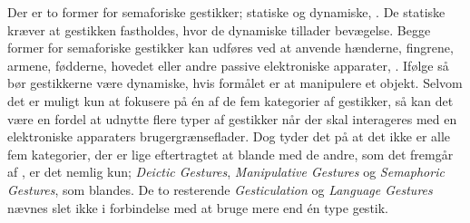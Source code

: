 Der er to former for semaforiske gestikker; statiske og dynamiske, \parencite[s. 7]{PDF:ATaxonomyOfGestures}. De statiske kræver at gestikken fastholdes, hvor de dynamiske tillader bevægelse. Begge former for semaforiske gestikker kan udføres ved at anvende hænderne, fingrene, armene, fødderne, hovedet eller andre passive elektroniske apparater, \parencite[s. 7]{PDF:ATaxonomyOfGestures}. Ifølge \textcite[s. 823]{PDF:UnderstandingNaturalness} så bør gestikkerne være dynamiske, hvis formålet er at manipulere et objekt. \blankline
%
Selvom det er muligt kun at fokusere på én af de fem kategorier af gestikker, så kan det være en fordel at udnytte flere typer af gestikker når der skal interageres med en elektroniske apparaters brugergrænseflader. Dog tyder det på at det ikke er alle fem kategorier, der er lige eftertragtet at blande med de andre, som det fremgår af \textcite[s. 8]{PDF:ATaxonomyOfGestures}, er det nemlig kun; \textit{Deictic Gestures}, \textit{Manipulative Gestures} og \textit{Semaphoric Gestures}, som blandes. De to resterende \textit{Gesticulation} og \textit{Language Gestures} nævnes slet ikke i forbindelse med at bruge mere end én type gestik.
%
